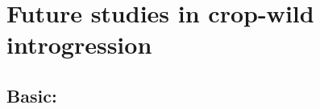 \documentclass[11pt]{article}
\newcommand{\gmj}[1]{\textcolor{blue}{ \emph{\scriptsize  #1}} } %
\begin{document}


\section*{Future studies in crop-wild introgression}


\subsection*{Basic:}%


\end{document}
